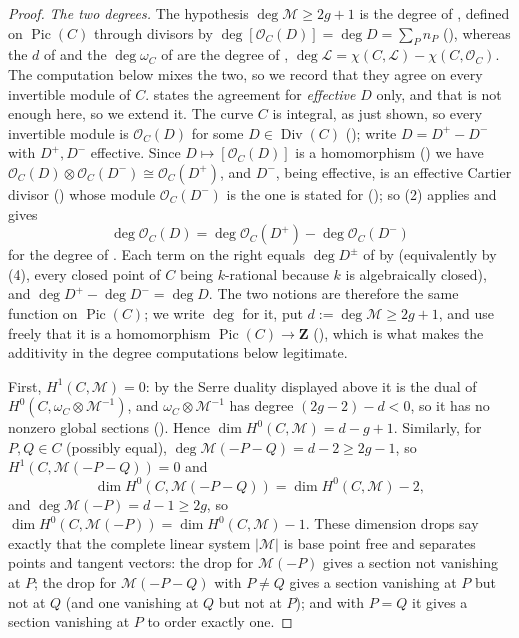 \begin{proof}
\emph{The two degrees.}  The hypothesis \(\deg\mathcal M\geq2g+1\) is
the degree of , defined on
\(\operatorname{Pic}(C)\) through divisors by
\(\deg[\mathcal O_C(D)]=\deg D=\sum_Pn_P\)
(), whereas the \(d\) of
 and the \(\deg\omega_C\) of
 are the degree of
,
\(\deg\mathcal L=\chi(C,\mathcal L)-\chi(C,\mathcal O_C)\).  The
computation below mixes the two, so we record that they agree on every
invertible module of \(C\).   states the
agreement for \emph{effective} \(D\) only, and that is not enough
here, so we extend it.  The curve \(C\) is integral, as just shown, so
every invertible module is \(\mathcal O_C(D)\) for some
\(D\in\operatorname{Div}(C)\)
(); write
\(D=D^+-D^-\) with \(D^+,D^-\) effective.  Since
\(D\mapsto[\mathcal O_C(D)]\) is a homomorphism
() we have
\(\mathcal O_C(D)\otimes\mathcal O_C(D^-)\cong\mathcal O_C(D^+)\),
and \(D^-\), being effective, is an effective Cartier divisor
() whose module \(\mathcal O_C(D^-)\) is the
one  is stated for
(); so
(2) applies and gives
\[
 \deg\mathcal O_C(D)=\deg\mathcal O_C(D^+)-\deg\mathcal O_C(D^-)
\]
for the degree of .  Each term on the
right equals \(\deg D^{\pm}\) of  by
 (equivalently by
(4), every closed point of \(C\) being
\(k\)-rational because \(k\) is algebraically closed), and
\(\deg D^+-\deg D^-=\deg D\).  The two notions are therefore the
same function on \(\operatorname{Pic}(C)\); we write \(\deg\) for it,
put \(d:=\deg\mathcal M\geq2g+1\), and use freely that it is a
homomorphism \(\operatorname{Pic}(C)\to\mathbf Z\)
(), which is what makes the additivity in the
degree computations below legitimate.

First, \(H^1(C,\mathcal M)=0\): by the Serre duality displayed above
it is the dual of \(H^0(C,\omega_C\otimes\mathcal M^{-1})\), and
\(\omega_C\otimes\mathcal M^{-1}\) has degree \((2g-2)-d<0\), so it
has no nonzero global sections
().
Hence \(\dim H^0(C,\mathcal M)=d-g+1\).  Similarly, for
\(P,Q\in C\) (possibly equal),
\(\deg\mathcal M(-P-Q)=d-2\geq2g-1\), so
\(H^1(C,\mathcal M(-P-Q))=0\) and
\[
 \dim H^0(C,\mathcal M(-P-Q))=\dim H^0(C,\mathcal M)-2,
\]
and \(\deg\mathcal M(-P)=d-1\geq2g\), so
\(\dim H^0(C,\mathcal M(-P))=\dim H^0(C,\mathcal M)-1\).  These
dimension drops say exactly that the complete linear system
\(|\mathcal M|\) is base point free and separates points and
tangent vectors: the drop for \(\mathcal M(-P)\) gives a section
not vanishing at \(P\); the drop for \(\mathcal M(-P-Q)\) with
\(P\neq Q\) gives a section vanishing at \(P\) but not at \(Q\)
(and one vanishing at \(Q\) but not at \(P\)); and with \(P=Q\) it
gives a section vanishing at \(P\) to order exactly one.


\end{proof}
